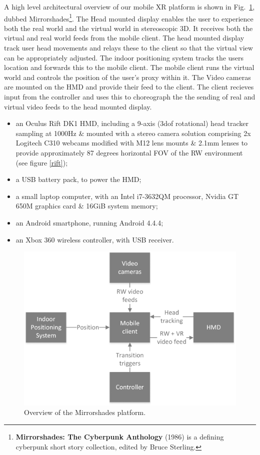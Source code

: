 \documentclass[conference]{acmsiggraph}
\begin{document}
A high level architectural overview of our mobile XR platform is shown in Fig.~\ref{systemarchitecture}, dubbed Mirrorshades\footnote{\textbf{Mirrorshades: The Cyberpunk Anthology} (1986) is a defining cyberpunk short story collection, edited by Bruce Sterling.}. The Head mounted display enables the user to experience both the real world and the virtual world in stereoscopic 3D. It receives both the virtual and real world feeds from the mobile client. The head mounted display track user head movements and relays these to the client so that the virtual view can be appropriately adjusted. The indoor positioning system tracks the users location and forwards this to the mobile client. The mobile client runs the virtual world and controls the position of the user's proxy within it. The Video cameras are mounted on the HMD and provide their feed to the client. The client recieves input from the controller and uses this to choreograph the the sending of real and virtual video feeds to the head mounted display.    

\begin{itemize}
	\item an Oculus Rift DK1 HMD, including a 9-axis (3dof rotational) head tracker sampling at 1000Hz \& mounted with a stereo camera solution comprising 2x Logitech C310 webcams modified with M12 lens mounts \& 2.1mm lenses to provide approximately 87 degrees horizontal FOV of the RW environment (see figure \ref{rift});
	\item a USB battery pack, to power the HMD;
	\item a small laptop computer, with an Intel i7-3632QM processor, Nvidia GT 650M graphics card \& 16GiB system memory;
	\item an Android smartphone, running Android 4.4.4;
	\item an Xbox 360 wireless controller, with USB receiver.
\end{itemize}
\begin{figure}[h]
	\thispagestyle{empty}
	\begin{center}
		\includegraphics[width=\linewidth]{images/system-architecture.png}
		\caption{Overview of the Mirrorshades platform.}
		\label{systemarchitecture}
	\end{center}
\end{figure}
\end{document}
